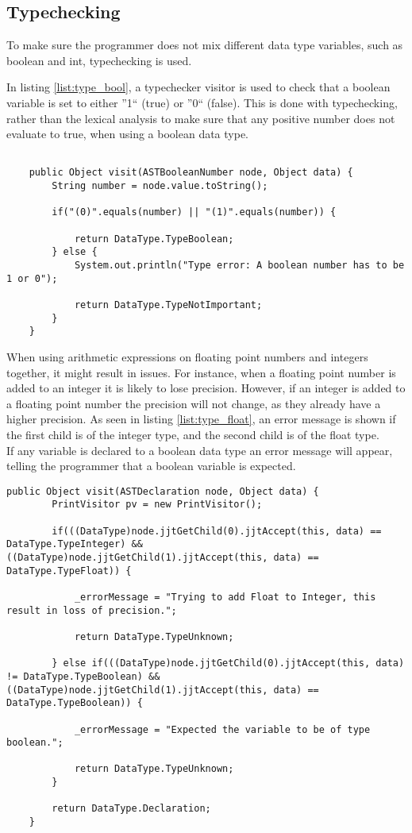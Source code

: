 \subsection{Typechecking}
To make sure the programmer does not mix different data type variables, such as boolean and int, typechecking is used.

In listing \ref{list:type_bool}, a typechecker visitor is used to check that a boolean variable is set to either ''1`` (true) or ''0`` (false). This is done with typechecking, rather than the lexical analysis to make sure that any positive number does not evaluate to true, when using a boolean data type.
\begin{lstlisting}[caption=Verifies/falsifies whether a boolean variable is 0 or 1, label=list:type_bool]

    public Object visit(ASTBooleanNumber node, Object data) {
    	String number = node.value.toString();

		if("(0)".equals(number) || "(1)".equals(number)) {
			
			return DataType.TypeBoolean;
		} else {
			System.out.println("Type error: A boolean number has to be 1 or 0");
			
			return DataType.TypeNotImportant;
		}	 
    }
\end{lstlisting}

When using arithmetic expressions on floating point numbers and integers together, it might result in issues. For instance, when a floating point number is added to an integer it is likely to lose precision. However, if an integer is added to a floating point number the precision will not change, as they already have a higher precision. As seen in listing \ref{list:type_float}, an error message is shown if the first child is of the integer type, and the second child is of the float type. \\
If any variable is declared to a boolean data type an error message will appear, telling the programmer that a boolean variable is expected.

\begin{lstlisting}[caption=Checks if float is being added to an integer\, and if a non-boolean type is set to a boolean value, label=list:type_float]
	public Object visit(ASTDeclaration node, Object data) {
		PrintVisitor pv = new PrintVisitor();

		if(((DataType)node.jjtGetChild(0).jjtAccept(this, data) == DataType.TypeInteger) && ((DataType)node.jjtGetChild(1).jjtAccept(this, data) == DataType.TypeFloat)) {

			_errorMessage = "Trying to add Float to Integer, this result in loss of precision.";

			return DataType.TypeUnknown;

		} else if(((DataType)node.jjtGetChild(0).jjtAccept(this, data) != DataType.TypeBoolean) && ((DataType)node.jjtGetChild(1).jjtAccept(this, data) == DataType.TypeBoolean)) {

			_errorMessage = "Expected the variable to be of type boolean.";

			return DataType.TypeUnknown;
		}

		return DataType.Declaration;
	}
\end{lstlisting}

